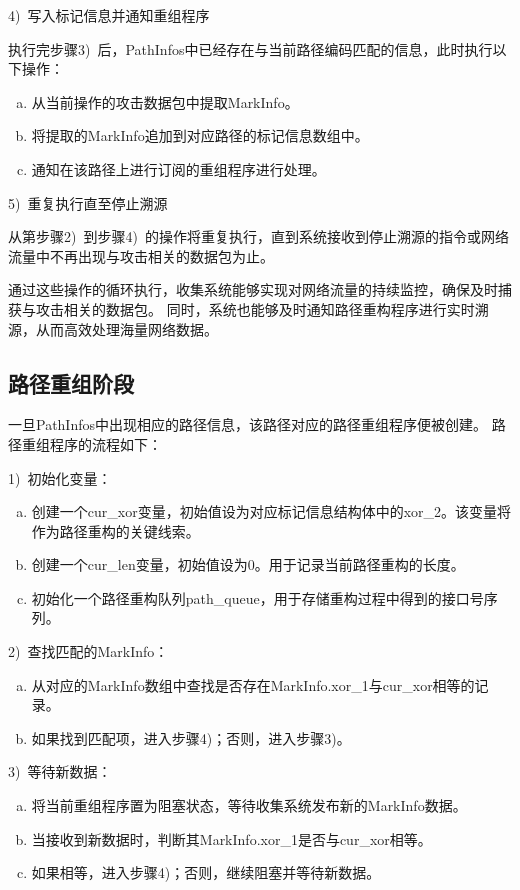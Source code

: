 4)~写入标记信息并通知重组程序\par
执行完步骤3)~后，PathInfos中已经存在与当前路径编码匹配的信息，此时执行以下操作：
\begin{enumerate}[a.]
	\item 从当前操作的攻击数据包中提取MarkInfo。
	\item 将提取的MarkInfo追加到对应路径的标记信息数组中。
	\item 通知在该路径上进行订阅的重组程序进行处理。
\end{enumerate}
\par
5)~重复执行直至停止溯源\par
从第步骤2)~到步骤4)~的操作将重复执行，直到系统接收到停止溯源的指令或网络流量中不再出现与攻击相关的数据包为止。\par

通过这些操作的循环执行，收集系统能够实现对网络流量的持续监控，确保及时捕获与攻击相关的数据包。
同时，系统也能够及时通知路径重构程序进行实时溯源，从而高效处理海量网络数据。

\subsection{路径重组阶段}
一旦PathInfos中出现相应的路径信息，该路径对应的路径重组程序便被创建。
路径重组程序的流程如下：\par
1)~初始化变量：\par
\begin{enumerate}[a.]
	\item 创建一个cur\_xor变量，初始值设为对应标记信息结构体中的xor\_2。该变量将作为路径重构的关键线索。
	\item 创建一个cur\_len变量，初始值设为0。用于记录当前路径重构的长度。
	\item 初始化一个路径重构队列path\_queue，用于存储重构过程中得到的接口号序列。
\end{enumerate}

2)~查找匹配的MarkInfo：\par
\begin{enumerate}[a.]
	\item 从对应的MarkInfo数组中查找是否存在MarkInfo.xor\_1与cur\_xor相等的记录。
	\item 如果找到匹配项，进入步骤4)；否则，进入步骤3)。
\end{enumerate}

3)~等待新数据：\par
\begin{enumerate}[a.]
	\item 将当前重组程序置为阻塞状态，等待收集系统发布新的MarkInfo数据。
	\item 当接收到新数据时，判断其MarkInfo.xor\_1是否与cur\_xor相等。
	\item 如果相等，进入步骤4)；否则，继续阻塞并等待新数据。
\end{enumerate}

